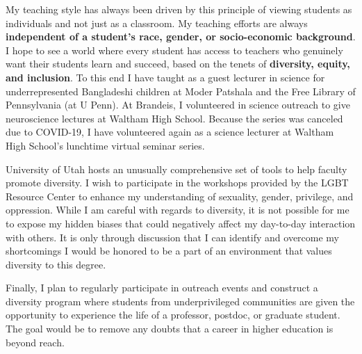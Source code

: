 \documentclass[a4paper,11pt]{article}
\begin{document}
My teaching style has always been driven by this principle of viewing students as individuals and not just as a classroom. My teaching efforts are always \textbf{independent of a student's race, gender, or socio-economic background}. I hope to see a world where every student has access to teachers who genuinely want their students learn and succeed, based on the tenets of \textbf{diversity, equity, and inclusion}. To this end I have taught as a guest lecturer in science for underrepresented Bangladeshi children at Moder Patshala and the Free Library of Pennsylvania (at U Penn). At Brandeis, I volunteered in science outreach to give neuroscience lectures at Waltham High School. Because the series was canceled due to COVID-19, I have volunteered again as a science lecturer at Waltham High School's lunchtime virtual seminar series.

University of Utah hosts an unusually comprehensive set of tools to help faculty promote diversity. I wish to participate in the workshops provided by the LGBT Resource Center to enhance my understanding of sexuality, gender, privilege, and oppression. While I am careful with regards to diversity, it is not possible for me to expose my hidden biases that could negatively affect my day-to-day interaction with others. It is only through discussion that I can identify and overcome my shortcomings I would be honored to be a part of an environment that values diversity to this degree.

Finally, I plan to regularly participate in outreach events and construct a diversity program where students from underprivileged communities are given the opportunity to experience the life of a professor, postdoc, or graduate student. The goal would be to remove any doubts that a career in higher education is beyond reach.




\end{document}
